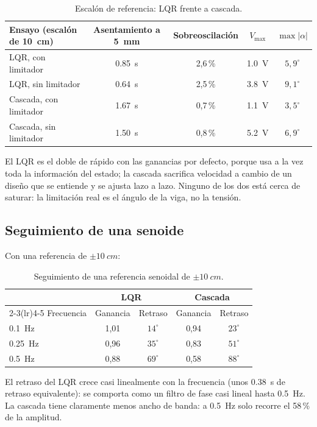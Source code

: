 \begin{table}[H]
\centering\small
\begin{tabular}{@{}lcccc@{}}
\toprule
Ensayo (escalón de \SI{10}{cm}) & Asentamiento a \SI{5}{mm} & Sobreoscilación & $V_{\max}$ & $\max|\alpha|$\\
\midrule
LQR, con limitador & \SI{0.85}{s} & 2,6\,\% & \SI{1.0}{V} & $5{,}9^\circ$\\
LQR, sin limitador & \SI{0.64}{s} & 2,5\,\% & \SI{3.8}{V} & $9{,}1^\circ$\\
Cascada, con limitador & \SI{1.67}{s} & 0,7\,\% & \SI{1.1}{V} & $3{,}5^\circ$\\
Cascada, sin limitador & \SI{1.50}{s} & 0,8\,\% & \SI{5.2}{V} & $6{,}9^\circ$\\
\bottomrule
\end{tabular}
\caption{Escalón de referencia: LQR frente a cascada.}
\label{tab:step}
\end{table}

El LQR es el doble de rápido con las ganancias por defecto, porque usa a la vez toda la información del estado; la cascada sacrifica velocidad a cambio de un diseño que se entiende y se ajusta lazo a lazo. Ninguno de los dos está cerca de saturar: la limitación real es el ángulo de la viga, no la tensión.

\subsection{Seguimiento de una senoide}
Con una referencia de $\pm\SI{10}{cm}$:

\begin{table}[H]
\centering\small
\begin{tabular}{@{}lcccc@{}}
\toprule
& \multicolumn{2}{c}{LQR} & \multicolumn{2}{c}{Cascada}\\
\cmidrule(lr){2-3}\cmidrule(lr){4-5}
Frecuencia & Ganancia & Retraso & Ganancia & Retraso\\
\midrule
\SI{0.1}{Hz} & 1,01 & $14^\circ$ & 0,94 & $23^\circ$\\
\SI{0.25}{Hz} & 0,96 & $35^\circ$ & 0,83 & $51^\circ$\\
\SI{0.5}{Hz} & 0,88 & $69^\circ$ & 0,58 & $88^\circ$\\
\bottomrule
\end{tabular}
\caption{Seguimiento de una referencia senoidal de $\pm\SI{10}{cm}$.}
\label{tab:sine}
\end{table}

El retraso del LQR crece casi linealmente con la frecuencia (unos \SI{0.38}{s} de retraso equivalente): se comporta como un filtro de fase casi lineal hasta \SI{0.5}{Hz}. La cascada tiene claramente menos ancho de banda: a \SI{0.5}{Hz} solo recorre el 58\,\% de la amplitud.

